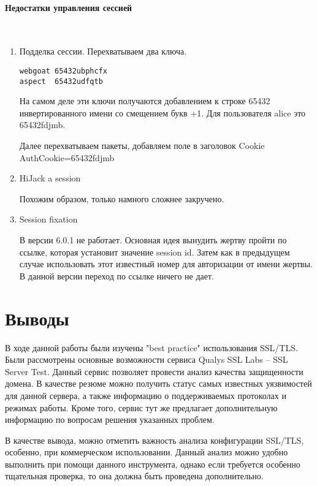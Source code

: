 \documentclass{article}
\begin{document}
\paragraph{Недостатки управления сессией}
~

\begin{enumerate}

\item Подделка сессии. Перехватываем два ключа.

\begin{verbatim}
webgoat 65432ubphcfx
aspect  65432udfqtb
\end{verbatim}

На самом деле эти ключи получаются добавлением к строке 65432 инвертированного имени со смещением букв +1. Для пользователя alice это 65432fdjmb.

Далее перехватываем пакеты, добавляем поле в заголовок Cookie AuthCookie=65432fdjmb

\item HiJack a session

Похожим образом, только намного сложнее закручено.

\item Session fixation

В версии 6.0.1 не работает. Основная идея вынудить жертву пройти по ссылке, которая установит значение session id. Затем как в предыдущем случае использовать этот известный номер для авторизации от имени жертвы. В данной версии переход по ссылке ничего не дает.
\end{enumerate}



\section{Выводы}

В ходе данной работы были изучены "best practice" использования SSL/TLS. Были рассмотрены основные возможности сервиса Qualys SSL Labs – SSL Server Test. Данный сервис позволяет провести анализ качества защищенности домена. В качестве резюме можно получить статус самых известных уязвимостей для данной сервера, а также информацию о поддерживаемых протоколах и режимах работы. Кроме того, сервис тут же предлагает дополнительную информацию по вопросам решения указанных проблем. 

В качестве вывода, можно отметить важность анализа конфигурации SSL/TLS, особенно, при коммерческом использовании. Данный анализ можно удобно выполнить при помощи данного инструмента, однако если требуется особенно тщательная проверка, то она должна быть проведена дополнительно.
 
\end{document}
